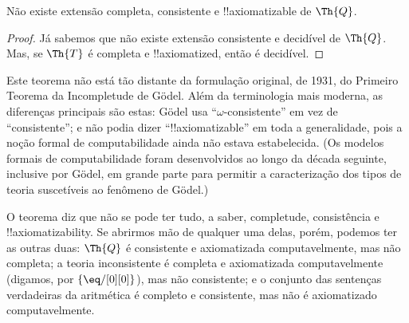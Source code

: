 \documentclass[../../../include/open-logic-section]{subfiles}
\begin{document}


\begin{thm}
Não existe extensão completa, consistente e !!{axiomatizable} de
$\Th{Q}$.
\end{thm}

\begin{proof}
Já sabemos que não existe extensão consistente e decidível de
$\Th{Q}$. Mas, se $\Th{T}$ é completa e !!{axiomatized}, então é
decidível.
\end{proof}

\begin{explain}
Este teorema não está tão distante da formulação original, de 1931, do
Primeiro Teorema da Incompletude de G\"odel. Além da terminologia mais
moderna, as diferenças principais são estas: G\"odel usa
``$\omega$-consistente'' em vez de ``consistente''; e não podia dizer
``!!{axiomatizable}'' em toda a generalidade, pois a noção formal de
computabilidade ainda não estava estabelecida. (Os modelos formais de
computabilidade foram desenvolvidos ao longo da década seguinte,
inclusive por G\"odel, em grande parte para permitir a caracterização
dos tipos de teoria suscetíveis ao fenômeno de G\"odel.)

O teorema diz que não se pode ter tudo, a saber, completude,
consistência e !!{axiomatizability}. Se abrirmos mão de qualquer uma
delas, porém, podemos ter as outras duas: $\Th{Q}$ é consistente e
axiomatizada computavelmente, mas não completa; a teoria inconsistente
é completa e axiomatizada computavelmente (digamos, por
$\{ \eq/[0][0] \}$), mas não consistente; e o conjunto das sentenças
verdadeiras da aritmética é completo e consistente, mas não é
axiomatizado computavelmente.
\end{explain}
\end{document}
